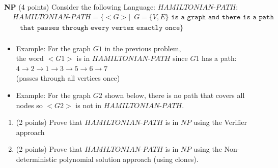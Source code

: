 \documentclass[12pt]{article}
\newenvironment{question}[2][Question]{\begin{trivlist}
\item[\hskip \labelsep {\bfseries #1}\hskip \labelsep {\bfseries #2.}]}{\end{trivlist}}
\begin{document}
\begin{question}{6}\textbf{NP} (4 points)
Consider the following Language: $HAMILTONIAN\text{-}PATH$:
    \begin{align*}
        &HAMILTONIAN\text{-}PATH = \{ < G > \vert \;  \ G= \{V,E\} \texttt{ is a graph and there is a path }\\
        & \quad \texttt{that passes through every  vertex exactly once}\}\\
    \end{align*}

\begin{itemize}
    \item Example: For the graph $G1$ in the previous problem, \\
    the word $<G1>$ is in $HAMILTONIAN\text{-}PATH$ since $G1$  has a path: \\
    $4 \rightarrow 2 \rightarrow 1 \rightarrow 3 \rightarrow 5 \rightarrow 6 \rightarrow 7$\\
    (passes through all vertices once)
    \item Example: For the graph $G2$ shown below, there is no path that covers all nodes so $<G2>$ is not in $HAMILTONIAN\text{-}PATH$.
\end{itemize}


\begin{center}
\end{center}

\begin{enumerate}
    \item (2 points) Prove that $HAMILTONIAN\text{-}PATH$ is in $NP$ using the Verifier approach

    \item (2 points) Prove that $HAMILTONIAN\text{-}PATH$ is in $NP$ using the Non-deterministic polynomial solution approach (using clones).

\end{enumerate}

\end{question}
\end{document}
